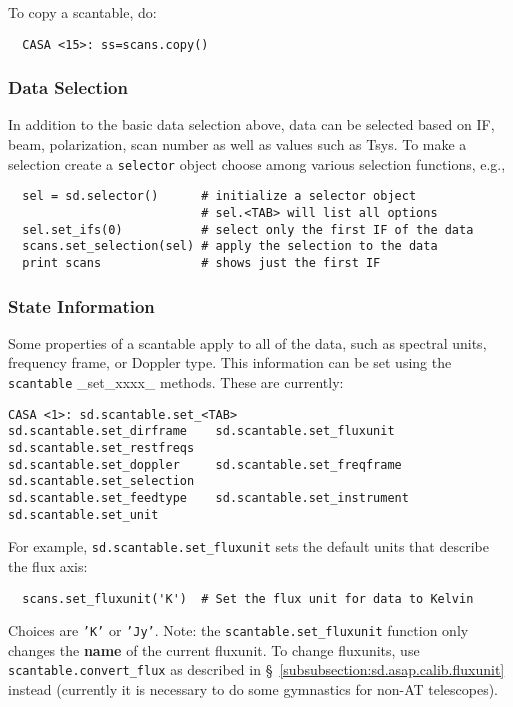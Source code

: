 To copy a scantable, do:

\small
\begin{verbatim}
  CASA <15>: ss=scans.copy()
\end{verbatim}
\normalsize

\subsubsection{Data Selection}
\label{subsubsection:sd.asap.scantable.select}

In addition to the basic data selection above, data can be selected
based on IF, beam, polarization, scan number as well as values such as
Tsys.  To make a selection create a {\tt selector} object choose among various
selection functions, e.g., 

\small
\begin{verbatim}
  sel = sd.selector()      # initialize a selector object
                           # sel.<TAB> will list all options
  sel.set_ifs(0)           # select only the first IF of the data
  scans.set_selection(sel) # apply the selection to the data
  print scans              # shows just the first IF
\end{verbatim}
\normalsize

\subsubsection{State Information}
\label{subsubsection:sd.asap.scantable.state}

Some properties of a scantable apply to all of the data, such as
spectral units, frequency frame, or Doppler type. This
information can be set using the {\tt scantable} \_set\_xxxx\_
methods.  These are currently:
\small
\begin{verbatim}
CASA <1>: sd.scantable.set_<TAB>
sd.scantable.set_dirframe    sd.scantable.set_fluxunit    sd.scantable.set_restfreqs   
sd.scantable.set_doppler     sd.scantable.set_freqframe   sd.scantable.set_selection   
sd.scantable.set_feedtype    sd.scantable.set_instrument  sd.scantable.set_unit
\end{verbatim}
\normalsize

For example, {\tt sd.scantable.set\_fluxunit} sets the default units
that describe the flux axis:
\small
\begin{verbatim}
  scans.set_fluxunit('K')  # Set the flux unit for data to Kelvin
\end{verbatim}
\normalsize
Choices are {\tt 'K'} or {\tt 'Jy'}.
Note: the {\tt scantable.set\_fluxunit} function only changes the {\bf name}
of the current fluxunit. To change fluxunits, use 
{\tt scantable.convert\_flux} as described in 
\S~\ref{subsubsection:sd.asap.calib.fluxunit}
instead (currently it is necessary to do some gymnastics for non-AT
telescopes).

